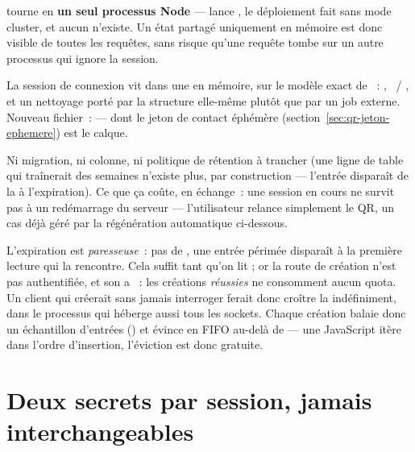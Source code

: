 \begin{constat}
 tourne en \textbf{un seul processus Node} ---  lance
, le déploiement fait  sans mode
cluster, et aucun  n'existe. Un état partagé uniquement en
mémoire est donc visible de toutes les requêtes, sans risque qu'une requête tombe sur un
autre processus qui ignore la session.
\end{constat}

La session de connexion vit dans une  en mémoire, sur le modèle exact de
~:
, ~/ , et un nettoyage porté par la structure
elle-même plutôt que par un job externe. Nouveau fichier~:  --- dont le jeton de contact
éphémère (section~\ref{sec:qr-jeton-ephemere}) est le calque.

\begin{note}
Ni migration, ni colonne, ni politique de rétention à trancher (une ligne de table qui
traînerait des semaines n'existe plus, par construction --- l'entrée disparaît de la
 à l'expiration). Ce que ça coûte, en échange~: une session en cours ne survit
pas à un redémarrage du serveur --- l'utilisateur relance simplement le QR, un cas déjà
géré par la régénération automatique ci-dessous.
\end{note}

\begin{note}
L'expiration est \emph{paresseuse}~: pas de , une entrée périmée
disparaît à la première lecture qui la rencontre. Cela suffit tant qu'on lit ; or la route
de création n'est pas authentifiée, et son  a
~: les créations \emph{réussies} ne consomment aucun quota.
Un client qui créerait sans jamais interroger ferait donc croître la 
indéfiniment, dans le processus qui héberge aussi tous les sockets. Chaque création balaie
donc un échantillon d'entrées () et évince en FIFO au-delà de
 --- une  JavaScript itère dans l'ordre d'insertion, l'éviction
est donc gratuite.
\end{note}

\section{Deux secrets par session, jamais interchangeables}
\label{sec:qr-deux-secrets}

